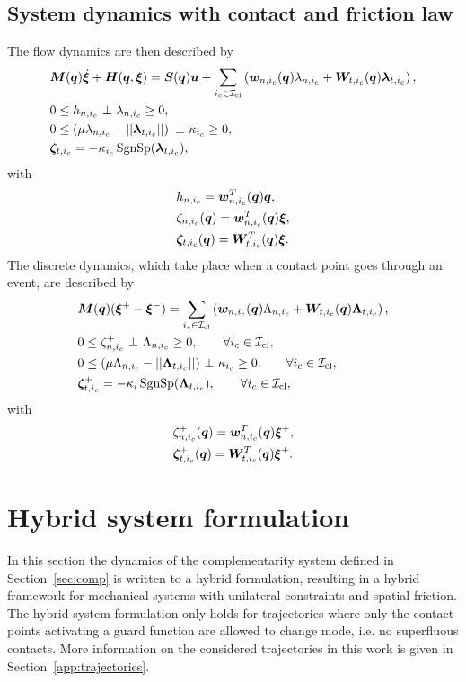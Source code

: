 \documentclass[../DC2017114Bouma.tex]{subfiles}
\begin{document}
\subsection{System dynamics with contact and friction law}
The flow dynamics are then described by
\begin{align}
&\Mb(\qb)\dot{\xib} + \Hb(\qb,\xib) = \Sb(\qb)\ub + \sum_{i_c\in\Ic_{\text{cl}}}\left(\wb_{n,i_c}(\qb)\lambda_{n,i_c} + \Wb_{t,i_c}(\qb)\lambdab_{t,i_c} \right), \label{eq:ncpcontact1}\\
&0\leq h_{n,i_c}\ \bot\ \lambda_{n,i_c} \geq 0,\label{eq:ncpcontact2}\\
&0\leq \left(\mu\lambda_{n,i_c} - ||\lambdab_{t,i_c}||\right)\ \bot\ \kappa_{i_c} \geq 0,\label{eq:ncpcontact3}\\
&\zetab_{t,i_c} = -\kappa_{i_c}\SgnSp(\lambdab_{t,i_c}),\label{eq:ncpcontact4}
\end{align}
with 
\begin{align}
&h_{n,i_c} = {\boldsymbol{w}}_{n,i_c}^T({\boldsymbol{q}}){\boldsymbol{q}},\label{eq:h}\\
&\zeta_{n,i_c}({\boldsymbol{q}}) = {\boldsymbol{w}}^T_{n,i_c}({\boldsymbol{q}}) \boldsymbol{\xi},  \label{eq:zetan}\\
&\boldsymbol{\zeta}_{t,i_c}({\boldsymbol{q}}) = {\boldsymbol{W}}^T_{t,i_c}({\boldsymbol{q}}) \boldsymbol{\xi}. \label{eq:zetab}
\end{align}
The discrete dynamics, which take place when a contact point goes through an event, are described by
\begin{align}
&\Mb(\qb)(\xib^+ - \xib^-) = \sum_{i_c\in\Ic_{\text{cl}}}\left( \wb_{n,i_c}(\qb)\Lambda_{n,i_c} + \Wb_{t,i_c}(\qb)\Lambdab_{t,i_c}\right), \label{eq:ncpimpact1}\\
&0\leq \zeta_{n,i_c}^+\ \bot\ \Lambda_{n,i_c} \geq 0, \qquad \forall i_c\in\Ic_{\text{cl}},\label{eq:ncpimpact2}\\
&0 \leq (\mu\Lambda_{n,i_c} - ||\Lambdab_{t,i_c}||)\ \bot\ \kappa_{i_c} \geq 0. \qquad \forall i_c\in\Ic_{\text{cl}},\label{eq:ncpimpact3}\\
&\zetab_{t,i_c}^+ = -\kappa_i\SgnSp(\Lambdab_{t,i_c}),\qquad \forall i_c\in\Ic_{\text{cl}},\label{eq:ncpimpact4}
\end{align}
with 
\begin{align}
&\zeta^+_{n,i_c}({\boldsymbol{q}}) = {\boldsymbol{w}}^T_{n,i_c}({\boldsymbol{q}}) \boldsymbol{\xi}^+,\\
&\boldsymbol{\zeta}^+_{t,i_c}({\boldsymbol{q}}) = {\boldsymbol{W}}^T_{t,i_c}({\boldsymbol{q}}) \boldsymbol{\xi}^+.\label{eq:ncpimpactend}
\end{align}

\section{Hybrid system formulation}
In this section the dynamics of the complementarity system defined in Section~\ref{sec:comp} is written to a hybrid formulation, resulting in a hybrid framework for mechanical systems with unilateral constraints and spatial friction. The hybrid system formulation only holds for trajectories where only the contact points activating a guard function are allowed to change mode, i.e. no superfluous contacts. More information on the considered trajectories in this work is given in Section~\ref{app:trajectories}.
\end{document}
